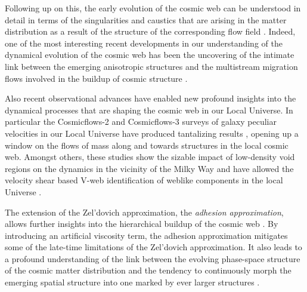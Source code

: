 Following up on this, the early evolution of the cosmic web can be understood in detail in terms of the singularities and caustics that 
are arising in the matter distribution as a result of the structure of the corresponding flow field \citep[see][]{Shandarin1989,Hidding2014}. 
Indeed, one of the most interesting recent developments in our understanding of the dynamical evolution of the cosmic web has been the 
uncovering of the intimate link between the emerging anisotropic structures and the multistream migration flows involved in the buildup of 
cosmic structure \citep[][]{Shandarin2011,Shandarin2012,Falck2012,Abel2012}. 

Also recent observational advances have enabled new 
profound insights into the dynamical processes that are shaping the cosmic web in our Local Universe. In particular the Cosmicflows-2 and 
Cosmicflows-3 surveys of galaxy peculiar velocities in our Local Universe have produced tantalizing results \citep{Courtois2013,Tully2014}, opening up a window on the flows of mass along and towards structures in the local cosmic web. Amongst others, these studies show 
the sizable impact of low-density void regions on the dynamics in the vicinity of the Milky Way and have allowed 
the velocity shear based V-web identification of weblike components in the local Universe \citep{Hoffman2017}. 

The extension of the Zel'dovich approximation, the \emph{adhesion approximation}, allows further insights into the hierarchical buildup 
of the cosmic web \citep{Gurbatov1989,Kofman1992,Hidding2012}. By introducing an artificial viscosity term, the adhesion 
approximation mitigates some of the late-time limitations of the Zel'dovich approximation. It also leads to a profound understanding 
of the link between the evolving phase-space structure of the cosmic matter distribution and the tendency to continuously morph the 
emerging spatial structure into one marked by ever larger structures \citep[see also][for a review of analytical extensions to the Zel'dovich approximation]{1995PhR...262....1S}. 

